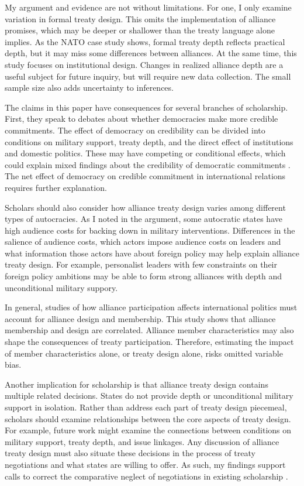 \documentclass[12pt]{article}
\begin{document}
My argument and evidence are not without limitations. 
For one, I only examine variation in formal treaty design. 
This omits the implementation of alliance promises, which may be deeper or shallower than the treaty language alone implies. 
As the NATO case study shows, formal treaty depth reflects practical depth, but it may miss some differences between alliances. 
At the same time, this study focuses on institutional design. 
Changes in realized alliance depth are a useful subject for future inquiry, but will require new data collection.
The small sample size also adds uncertainty to inferences.  


The claims in this paper have consequences for several branches of scholarship. 
First, they speak to debates about whether democracies make more credible commitments. 
The effect of democracy on credibility can be divided into conditions on military support, treaty depth, and the direct effect of institutions and domestic politics. 
These may have competing or conditional effects, which could explain mixed findings about the credibility of democratic commitments \citep{Schultz1999, Leeds1999, Thyne2012, DownesSechser2012}.
The net effect of democracy on credible commitment in international relations requires further explanation. 


Scholars should also consider how alliance treaty design varies among different types of autocracies. 
As I noted in the argument, some autocratic states have high audience costs for backing down in military interventions. 
Differences in the salience of audience costs, which actors impose audience costs on leaders and what information those actors have about foreign policy \citep{Weeks2008} may help explain alliance treaty design.
For example, personalist leaders with few constraints on their foreign policy ambitions may be able to form strong alliances with depth and unconditional military suppory. 


In general, studies of how alliance participation affects international politics must account for alliance design and membership. 
This study shows that alliance membership and design are correlated. 
Alliance member characteristics may also shape the consequences of treaty participation.  
Therefore, estimating the impact of member characteristics alone, or treaty design alone, risks omitted variable bias. 


Another implication for scholarship is that alliance treaty design contains multiple related decisions. 
States do not provide depth or unconditional military support in isolation. 
Rather than address each part of treaty design piecemeal, scholars should examine relationships between the core aspects of treaty design. 
For example, future work might examine the connections between conditions on military support, treaty depth, and issue linkages.  
Any discussion of alliance treaty design must also situate these decisions in the process of treaty negotiations and what states are willing to offer.
As such, my findings support calls to correct the comparative neglect of negotiations in existing scholarship \citep{Poast2019a}. 
\end{document}
